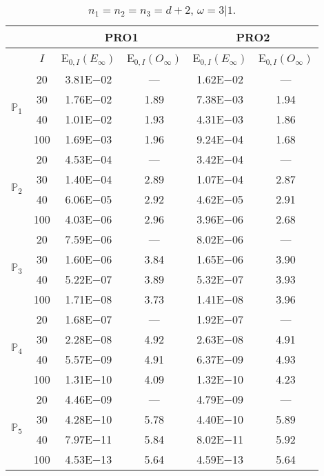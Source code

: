 \begin{table}[H]
\caption{$n_1=n_2=n_3=d+2$, $\omega=3|1$.}
\setlength{\tabcolsep}{5pt}
\centering
\begin{tabular}{@{}l c c c c c@{}}
\toprule
 &  & \multicolumn{2}{c}{PRO1} & \multicolumn{2}{c}{PRO2}\\
\midrule
 & $I$ & E$_{0,I}(E_{\infty})$ & E$_{0,I}(O_{\infty})$ & E$_{0,I}(E_{\infty})$ & E$_{0,I}(O_{\infty})$\\
\midrule
\multirow{4}{*}{$\mathbb{P}_{1}$}
 & 20 & 3.81E$-$02 & --- & 1.62E$-$02 & ---\\
 & 30 & 1.76E$-$02 & 1.89 & 7.38E$-$03 & 1.94 \\
 & 40 & 1.01E$-$02 & 1.93 & 4.31E$-$03 & 1.86 \\
 & 100 & 1.69E$-$03 & 1.96 & 9.24E$-$04 & 1.68 \\
\midrule
\multirow{4}{*}{$\mathbb{P}_{2}$}
 & 20 & 4.53E$-$04 & --- & 3.42E$-$04 & ---\\
 & 30 & 1.40E$-$04 & 2.89 & 1.07E$-$04 & 2.87 \\
 & 40 & 6.06E$-$05 & 2.92 & 4.62E$-$05 & 2.91 \\
 & 100 & 4.03E$-$06 & 2.96 & 3.96E$-$06 & 2.68 \\
\midrule
\multirow{4}{*}{$\mathbb{P}_{3}$}
 & 20 & 7.59E$-$06 & --- & 8.02E$-$06 & ---\\
 & 30 & 1.60E$-$06 & 3.84 & 1.65E$-$06 & 3.90 \\
 & 40 & 5.22E$-$07 & 3.89 & 5.32E$-$07 & 3.93 \\
 & 100 & 1.71E$-$08 & 3.73 & 1.41E$-$08 & 3.96 \\
\midrule
\multirow{4}{*}{$\mathbb{P}_{4}$}
 & 20 & 1.68E$-$07 & --- & 1.92E$-$07 & ---\\
 & 30 & 2.28E$-$08 & 4.92 & 2.63E$-$08 & 4.91 \\
 & 40 & 5.57E$-$09 & 4.91 & 6.37E$-$09 & 4.93 \\
 & 100 & 1.31E$-$10 & 4.09 & 1.32E$-$10 & 4.23 \\
\midrule
\multirow{4}{*}{$\mathbb{P}_{5}$}
 & 20 & 4.46E$-$09 & --- & 4.79E$-$09 & ---\\
 & 30 & 4.28E$-$10 & 5.78 & 4.40E$-$10 & 5.89 \\
 & 40 & 7.97E$-$11 & 5.84 & 8.02E$-$11 & 5.92 \\
 & 100 & 4.53E$-$13 & 5.64 & 4.59E$-$13 & 5.64 \\
\bottomrule
\end{tabular}
\label{Table:PRO:Rodrigo:Test10}
\end{table}
